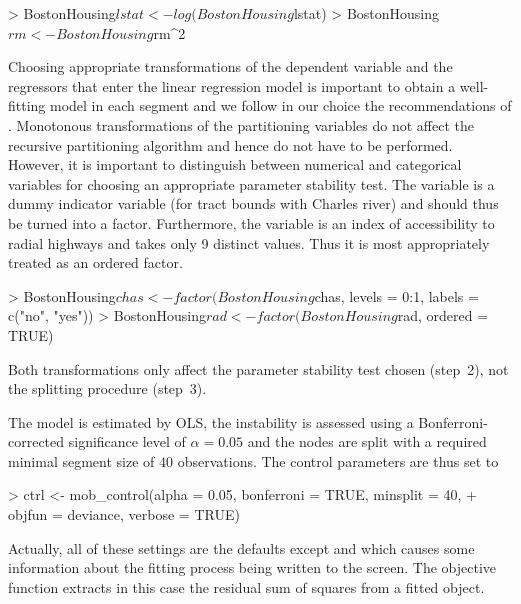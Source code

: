 \documentclass{Z}
\begin{document}
\begin{Schunk}
\begin{Sinput}
> BostonHousing$lstat <- log(BostonHousing$lstat)
> BostonHousing$rm <- BostonHousing$rm^2
\end{Sinput}
\end{Schunk}

Choosing appropriate
transformations of the dependent variable and the regressors that enter the linear
regression model is important to obtain a well-fitting model in each segment and
we follow in our choice the recommendations of \cite{BreimanFriedman1985}. Monotonous
transformations of the partitioning variables do not affect the recursive partitioning
algorithm and hence do not have to be performed. However, it is important to distinguish
between numerical and categorical variables for choosing an appropriate parameter 
stability test. The variable  is a dummy indicator variable (for tract bounds
with Charles river) and should thus be turned into a factor. Furthermore, the variable
 is an index of accessibility to radial highways and takes only 9 distinct
values. Thus it is most appropriately treated as an ordered factor.

\begin{Schunk}
\begin{Sinput}
> BostonHousing$chas <- factor(BostonHousing$chas, levels = 0:1, labels = c("no", "yes"))
> BostonHousing$rad <- factor(BostonHousing$rad, ordered = TRUE)
\end{Sinput}
\end{Schunk}

Both transformations only affect the parameter stability test chosen (step~2), not the splitting
procedure (step~3).

The model is estimated
by OLS, the instability is assessed using a Bonferroni-corrected
significance level of $\alpha = 0.05$ and the nodes are split with a required minimal
segment size of $40$ observations. The control parameters are thus set to

\begin{Schunk}
\begin{Sinput}
> ctrl <- mob_control(alpha = 0.05, bonferroni = TRUE, minsplit = 40,
+   objfun = deviance, verbose = TRUE)
\end{Sinput}
\end{Schunk}

Actually, all of these settings are the defaults except  and
 which causes some information about the fitting process
being written to the screen. The objective function  extracts in
this case the residual sum of squares from a fitted  object.
\end{document}
